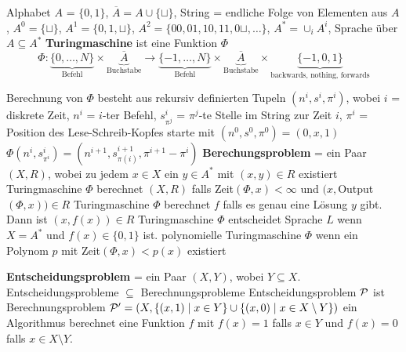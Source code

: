 \begin{outline}
    \1 Alphabet $A$ = $\{0,1\}$, $\overline{A}= A \cup \{\sqcup\}$, String = endliche Folge von Elementen aus $A$, $A^0 = \{\sqcup\}$, $A^1=\{0,1,\sqcup\}$, $A^2 = \{00, 01, 10, 11, 0\sqcup, \ldots\}$, $A^* = \cup_i A^i$, Sprache über $A \subseteq A^*$
    \1 \textbf{Turingmaschine} ist eine Funktion $\Phi$
    $$
    \Phi: \underbrace{\{0,\ldots, N\}}_{\text{Befehl}} 
    \times \underbrace{\overline{A}}_{\text{Buchstabe}} 
    \longrightarrow 
    \underbrace{\{-1,\ldots,N\}}_{\text{Befehl}} 
    \times \underbrace{\overline{A}}_{\text{Buchstabe}} 
    \times \underbrace{\{-1,0,1\}}_{\text{backwards, nothing, forwards}} 
    $$
    
        \2 Berechnung von $\Phi$ besteht aus rekursiv definierten Tupeln $(n^i,s^i,\pi^i)$, wobei
            \3 $i$ = diskrete Zeit, $n^i$ = $i$-ter Befehl, $s^i_{\pi^j}$ = $\pi^j$-te Stelle im String zur Zeit $i$, $\pi^i$ = Position des Lese-Schreib-Kopfes
            \3 starte mit $(n^0,s^0,\pi^0)=(0,x,1)$
            \3 $\Phi(n^i,s^i_{\pi^i})=(n^{i+1},s^{i+1}_{\pi(i)}, \pi^{i+1}-\pi^i)$
    \1 \textbf{Berechungsproblem} = ein Paar $(X,R)$, wobei zu jedem $x \in X$ ein $y\in A^*$ mit $(x,y)\in R$ existiert
        \2 Turingmaschine $\Phi$ berechnet $(X,R)$ falls Zeit$(\Phi,x)<\infty$ und $(x,$Output$(\Phi,x))\in R$
        \2 Turingmaschine $\Phi$ berechnet $f$ falls es genau eine Lösung $y$ gibt. Dann ist $(x,f(x))\in R$
        \2 Turingmaschine $\Phi$ entscheidet Sprache $L$ wenn $X=A^*$ und $f(x)\in \{0,1\}$ ist.
        \2 polynomielle Turingmaschine $\Phi$ wenn ein Polynom $p$ mit Zeit$(\Phi,x)<p(x)$ existiert

    \1 \textbf{Entscheidungsproblem} = ein Paar $(X,Y)$, wobei $Y\subseteq X$.     
    \1 Entscheidungsprobleme $\subseteq$ Berechnungsprobleme
        \2 Entscheidungsproblem $\mathcal{P}$ ist Berechnungsproblem $\mathcal{P}' = (X,\{(x,1) \mid x \in Y\} \cup \{(x,0) \mid x \in X\setminus Y \})$
        \2 ein Algorithmus berechnet eine Funktion $f$ mit $f(x)=1$ falls $x\in Y$ und $f(x)=0$ falls $x\in X\setminus Y$.
        

\end{outline}
